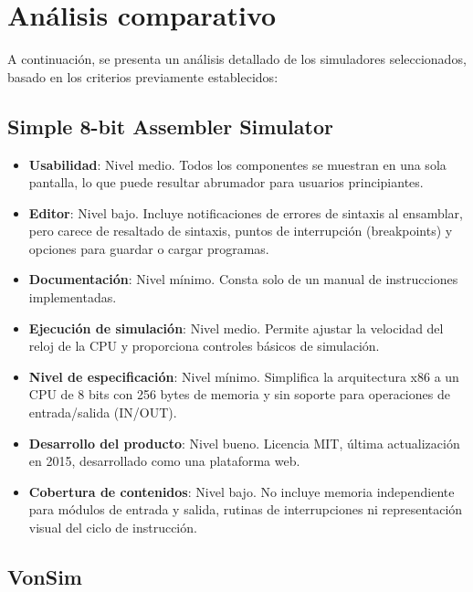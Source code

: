 \documentclass[12pt,oneside]{templates/unerthesis}
\providecommand{\tightlist}{%
  \setlength{\itemsep}{0pt}\setlength{\parskip}{0pt}}
\begin{document}
\hypertarget{anuxe1lisis-comparativo}{%
\section{Análisis comparativo}\label{anuxe1lisis-comparativo}}

A continuación, se presenta un análisis detallado de los simuladores seleccionados, basado en los criterios previamente establecidos:

\hypertarget{simple-8-bit-assembler-simulator}{%
\subsection{Simple 8-bit Assembler Simulator}\label{simple-8-bit-assembler-simulator}}

\begin{itemize}
\tightlist
\item
  \textbf{Usabilidad}: Nivel medio. Todos los componentes se muestran en una sola pantalla, lo que puede resultar abrumador para usuarios principiantes.
\item
  \textbf{Editor}: Nivel bajo. Incluye notificaciones de errores de sintaxis al ensamblar, pero carece de resaltado de sintaxis, puntos de interrupción (breakpoints) y opciones para guardar o cargar programas.
\item
  \textbf{Documentación}: Nivel mínimo. Consta solo de un manual de instrucciones implementadas.
\item
  \textbf{Ejecución de simulación}: Nivel medio. Permite ajustar la velocidad del reloj de la CPU y proporciona controles básicos de simulación.
\item
  \textbf{Nivel de especificación}: Nivel mínimo. Simplifica la arquitectura x86 a un CPU de 8 bits con 256 bytes de memoria y sin soporte para operaciones de entrada/salida (IN/OUT).
\item
  \textbf{Desarrollo del producto}: Nivel bueno. Licencia MIT, última actualización en 2015, desarrollado como una plataforma web.
\item
  \textbf{Cobertura de contenidos}: Nivel bajo. No incluye memoria independiente para módulos de entrada y salida, rutinas de interrupciones ni representación visual del ciclo de instrucción.
\end{itemize}

\hypertarget{vonsim}{%
\subsection{VonSim}\label{vonsim}}
\end{document}
